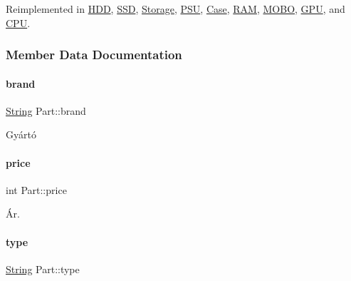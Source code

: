 Reimplemented in \mbox{\hyperlink{class_h_d_d_a557271f835f56a25fe5c264019f20bb2}{H\+DD}}, \mbox{\hyperlink{class_s_s_d_a6e252152f8ba75043edec67e19d686e0}{S\+SD}}, \mbox{\hyperlink{class_storage_ad6c13f251a39612a7628980bf2f12918}{Storage}}, \mbox{\hyperlink{class_p_s_u_a3690cd51ec36d4a1417c22612793e01c}{P\+SU}}, \mbox{\hyperlink{class_case_a6cce910485e45c0b30018fce491c154f}{Case}}, \mbox{\hyperlink{class_r_a_m_ad43f71c742f078c98ab7fd9a26420c97}{R\+AM}}, \mbox{\hyperlink{class_m_o_b_o_a3dd7e36103afbb4b6c09b65975317b9c}{M\+O\+BO}}, \mbox{\hyperlink{class_g_p_u_ad54f6d21007e216f27dc738aea2de836}{G\+PU}}, and \mbox{\hyperlink{class_c_p_u_aa2cf81d7f0005da72c7a99b1b9459c27}{C\+PU}}.



\subsubsection{Member Data Documentation}
\mbox{\label{class_part_ae06f2fdeb7fbbdb229a7aca151f3e341}} 
\paragraph{\texorpdfstring{brand}{brand}}
{\footnotesize\ttfamily \mbox{\hyperlink{class_string}{String}} Part\+::brand\hspace{0.3cm}{\ttfamily [protected]}}



Gyártó 

\mbox{\label{class_part_a8e71223aed1da95a974f33d8d6c91bb1}} 
\paragraph{\texorpdfstring{price}{price}}
{\footnotesize\ttfamily int Part\+::price\hspace{0.3cm}{\ttfamily [protected]}}



Ár. 

\mbox{\label{class_part_a101dbcc5c4b21564df7414c7eb0eae88}} 
\paragraph{\texorpdfstring{type}{type}}
{\footnotesize\ttfamily \mbox{\hyperlink{class_string}{String}} Part\+::type\hspace{0.3cm}{\ttfamily [protected]}}



